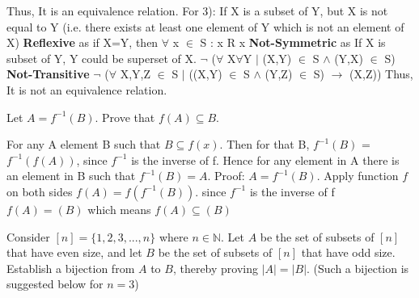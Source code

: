 \documentclass[addpoints]{exam}
\begin{document}
\begin{questions}
\begin{parts}
\begin{solution}
   \newline Thus, It is an equivalence relation.
   \newline
   \newline
   \newline For 3): \newline   
    If X is a subset of Y, but X is not equal to Y (i.e. there exists at least one element of Y which is not an element of X) \newline 
   \textbf{Reflexive} as if X=Y, then  $\forall $ x $\in$ S : x R x  \newline
   \textbf{Not-Symmetric} as  If X is subset of Y, Y could be superset of X.
   \newline  $\neg$ ($\forall $ X$\forall $Y $|$ (X,Y) $\in$ S $\wedge$ (Y,X) $\in$ S) \newline
   \textbf{Not-Transitive} \newline 
   $\neg$ ($\forall$ X,Y,Z $\in$ S $|$ ((X,Y) $\in$ S  $\wedge$ (Y,Z) $\in$ S) $\rightarrow$ (X,Z))
   \newline 
   Thus, It is not an equivalence relation.
   
   
  \end{solution} 
  

\end{parts}

\question[15] Let $A = f^{-1}(B)$. Prove that $f(A) \subseteq B$.
  \begin{solution}\newline
    For any A  element B such that $B \subseteq f(x). $
    Then for that B, $f^{-1} (B)$ = $f^{-1}(f(A)) $, since $f^{-1}$ is the inverse of f. 
    Hence for any element in A there is an element  in B such that $f^{-1}(B) = A.$
    \newline Proof: \newline
    $A = f^{-1}(B)$. 
    \newline Apply function $f$ on both sides \newline
    $f(A) = f(f^{-1}(B))$. \newline  since $f^{-1}$ is the inverse of f \newline
    $f(A) = (B)$ which means  $f(A) \subseteq  (B)$
    
    
  \end{solution}

\question[15] Consider $[n] = \{1,2,3,...,n\}$ where $n \in \mathbb{N}$. Let $A$ be the set of subsets of $[n]$ that have even size, and let $B$ be the set of subsets of $[n]$ that have odd size. Establish a bijection from $A$ to $B$, thereby proving $|A| = |B|$. (Such a bijection is suggested below for $n = 3$) 


\end{questions}
\end{document}
